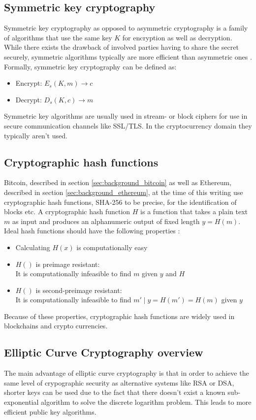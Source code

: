 \documentclass[12pt,msc,a4paper,oneside]{ucl_thesis}
\begin{document}
\subsection{Symmetric key cryptography}
Symmetric key cryptography as opposed to asymmetric cryptography is a family of algorithms that use the same key $K$ for encryption as well as decryption. While there exists the drawback of involved parties having to share the secret securely, symmetric algorithms typically are more efficient than asymmetric ones \cite{BKarp}. Formally, symmetric key cryptography can be defined as:
\begin{itemize}
    \item{Encrypt: } $E_s(K, m) \rightarrow c$
    \item{Decrypt: } $D_s(K, c) \rightarrow m$
\end{itemize}
Symmetric key algorithms are usually used in stream- or block ciphers for use in secure communication channels like SSL/TLS. In the cryptocurrency domain they typically aren't used.

\subsection{Cryptographic hash functions}
Bitcoin, described in section \ref{sec:background_bitcoin} as well as Ethereum, described in section \ref{sec:background_ethereum}, at the time of this writing use cryptographic hash functions, SHA-256 to be precise, for the identification of blocks etc. A cryptographic hash function $H$ is a function that takes a plain text $m$ as input and produces an alphanumeric output of fixed length $y = H(m)$. Ideal hash functions should have the following properties \cite{BKarp} \cite{wiki:cryptographic_hash_fn}:
\begin{itemize}
    \item{Calculating $H(x)$ is computationally easy}
    \item{$H()$ is preimage resistant: } \\ It is computationally infeasible to find $m$ given $y$ and $H$
    \item{$H()$ is second-preimage resistant: } \\ It is computationally infeasible to find $m' \mid y=H(m')=H(m)$ given $y$
\end{itemize}
Because of these properties, cryptographic hash functions are widely used in blockchains and crypto currencies.

\subsection{Elliptic Curve Cryptography overview} \label{sec:background_elliptic_curve}
The main advantage of elliptic curve cryptography is that in order to achieve the same level of crypographic security as alternative systems like RSA or DSA, shorter keys can be used due to the fact that there doesn't exist a known sub-exponential algorithm to solve the discrete logarithm problem. This leads to more efficient public key algorithms. \cite{EllipticCurveOverview} \cite{Araki1998} 
\end{document}
